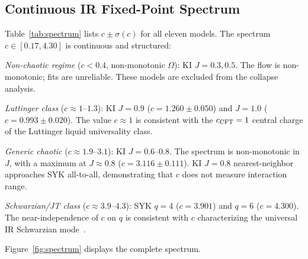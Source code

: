 \documentclass[aps,prl,twocolumn,showpacs,preprintnumbers,superscriptaddress]{revtex4-2}
\begin{document}
\subsection{Continuous IR Fixed-Point Spectrum}

Table~\ref{tab:spectrum} lists $c \pm \sigma(c)$ for all eleven models.
The spectrum $c \in [0.17, 4.30]$ is continuous and structured:

\emph{Non-chaotic regime} ($c < 0.4$, non-monotonic $\Omega$):
KI $J = 0.3, 0.5$. The flow is non-monotonic; fits are unreliable.
These models are excluded from the collapse analysis.

\emph{Luttinger class} ($c \approx 1$--$1.3$):
KI $J = 0.9$ ($c = 1.260 \pm 0.050$) and $J = 1.0$ ($c = 0.993 \pm 0.020$).
The value $c \approx 1$ is consistent with the $c_{\rm CFT} = 1$ central
charge of the Luttinger liquid universality class.

\emph{Generic chaotic} ($c \approx 1.9$--$3.1$):
KI $J = 0.6$--$0.8$. The spectrum is non-monotonic in $J$, with a maximum
at $J \approx 0.8$ ($c = 3.116 \pm 0.111$). KI $J = 0.8$ nearest-neighbor
approaches SYK all-to-all, demonstrating that $c$ does not measure
interaction range.

\emph{Schwarzian/JT class} ($c \approx 3.9$--$4.3$):
SYK $q = 4$ ($c = 3.901$) and $q = 6$ ($c = 4.300$).
The near-independence of $c$ on $q$ is consistent with $c$ characterizing
the universal IR Schwarzian mode~\cite{Kitaev2015,Maldacena2016}.

Figure~\ref{fig:spectrum} displays the complete spectrum.
\end{document}
